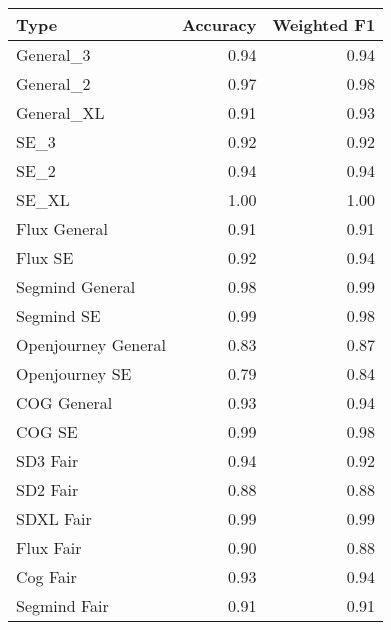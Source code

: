 \begin{tabular}{lrr}
\toprule
Type & Accuracy & Weighted F1 \\
\midrule
General_3 & 0.94 & 0.94 \\
General_2 & 0.97 & 0.98 \\
General_XL & 0.91 & 0.93 \\
SE_3 & 0.92 & 0.92 \\
SE_2 & 0.94 & 0.94 \\
SE_XL & 1.00 & 1.00 \\
Flux General & 0.91 & 0.91 \\
Flux SE & 0.92 & 0.94 \\
Segmind General & 0.98 & 0.99 \\
Segmind SE & 0.99 & 0.98 \\
Openjourney General & 0.83 & 0.87 \\
Openjourney SE & 0.79 & 0.84 \\
COG General & 0.93 & 0.94 \\
COG SE & 0.99 & 0.98 \\
SD3 Fair & 0.94 & 0.92 \\
SD2 Fair & 0.88 & 0.88 \\
SDXL Fair & 0.99 & 0.99 \\
Flux Fair & 0.90 & 0.88 \\
Cog Fair & 0.93 & 0.94 \\
Segmind Fair & 0.91 & 0.91 \\
\bottomrule
\end{tabular}
